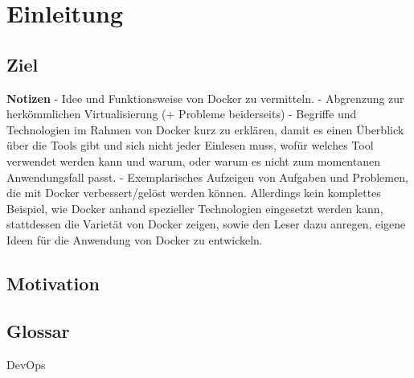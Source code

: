 \chapter{Einleitung}
\section{Ziel}
\textbf{Notizen}
- Idee und Funktionsweise von Docker zu vermitteln.
- Abgrenzung zur herkömmlichen Virtualisierung (+ Probleme beiderseits)
- Begriffe und Technologien im Rahmen von Docker kurz zu erklären, damit es einen Überblick über die Tools gibt und sich nicht jeder Einlesen muss, wofür welches Tool verwendet werden kann und warum, oder warum es nicht zum momentanen Anwendungsfall passt.
- Exemplarisches Aufzeigen von Aufgaben und Problemen, die mit Docker verbessert/gelöst werden können. Allerdings kein komplettes Beispiel, wie Docker anhand spezieller Technologien eingesetzt werden kann, stattdessen die Varietät von Docker zeigen, sowie den Leser dazu anregen, eigene Ideen für die Anwendung von Docker zu entwickeln.
\section{Motivation}
\section{Glossar}
\begin{description}
    \item [DevOps]
\end{description}
